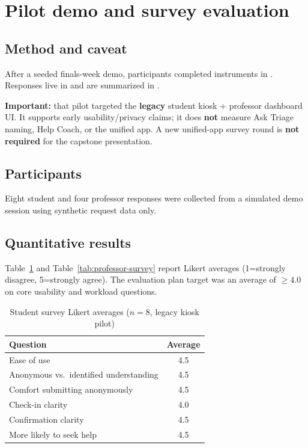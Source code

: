 \documentclass[11pt]{article}
\begin{document}
\section{Pilot demo and survey evaluation}
\subsection{Method and caveat}
After a seeded finals-week demo, participants completed instruments in
. Responses live in  and are
summarized in .

\textbf{Important:} that pilot targeted the \textbf{legacy} student kiosk +
professor dashboard UI. It supports early usability/privacy claims; it does
\textbf{not} measure Ask Triage naming, Help Coach, or the unified app.
A new unified-app survey round is \textbf{not required} for the capstone
presentation.

\subsection{Participants}
Eight student and four professor responses were collected from a simulated demo
session using synthetic request data only.

\subsection{Quantitative results}
Table~\ref{tab:student-survey} and Table~\ref{tab:professor-survey} report
Likert averages (1=strongly disagree, 5=strongly agree). The evaluation plan
target was an average of $\geq 4.0$ on core usability and workload questions.

\begin{table}[htbp]
  \centering
  \caption{Student survey Likert averages ($n=8$, legacy kiosk pilot)}
  \label{tab:student-survey}
  \begin{tabular}{@{}lc@{}}
    \toprule
    Question & Average \\
    \midrule
    Ease of use & 4.5 \\
    Anonymous vs.\ identified understanding & 4.5 \\
    Comfort submitting anonymously & 4.5 \\
    Check-in clarity & 4.0 \\
    Confirmation clarity & 4.5 \\
    More likely to seek help & 4.5 \\
    \bottomrule
  \end{tabular}
\end{table}
\end{document}
